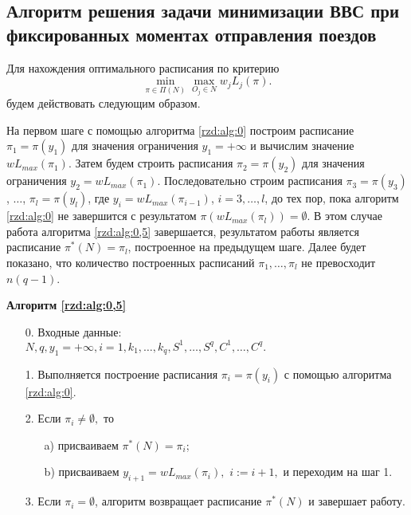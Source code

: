 \subsection{Алгоритм решения задачи минимизации ВВС при фиксированных моментах отправления поездов}\label{rzd:sec:main1:3}
Для нахождения оптимального расписания по критерию
\begin{equation*}
  \min\limits_{\pi \in \Pi(N)}\max\limits_{O_j\in N}w_j L_j(\pi).
\end{equation*}
будем действовать следующим образом.

На первом шаге с помощью алгоритма \ref{rzd:alg:0} построим расписание $\pi_1 = \pi(y_1)$ для значения ограничения $y_1 = +\infty$ и вычислим значение $wL_{max}(\pi_1)$. Затем будем строить расписания $\pi_2 = \pi(y_2)$ для значения ограничения $y_2 = wL_{max}(\pi_1)$. Последовательно строим расписания $\pi_3 =\pi(y_3)$, $\dots$, $\pi_{l} =\pi(y_l)$, где $y_i = wL_{max} (\pi_{i-1})$, $i=3, \dots, l$, до тех пор, пока алгоритм \ref{rzd:alg:0} не завершится с результатом $\pi(wL_{max}(\pi_{l})) = \emptyset.$ В этом случае работа алгоритма \ref{rzd:alg:0,5} завершается, результатом работы является расписание $\pi^{*}(N) = \pi_{l}$, построенное на предыдущем шаге. Далее будет показано, что количество построенных расписаний $\pi_1, \dots, \pi_l$ не превосходит $n(q-1)$.

\begin{algorithm}[H]\label{rzd:alg:0,5}
\NoCaptionOfAlgo
\caption{\textbf{Алгоритм \ref{rzd:alg:0,5}}}
\begin{itemize}
\item[0.] Входные данные:\\
$N, q, y_1 = +\infty, i=1, k_1, \dots, k_q, S^1, \dots, S^q, C^1, \dots, C^q. $
\item[1.] Выполняется построение расписания $\pi_i = \pi(y_i)$ с помощью алгоритма \ref{rzd:alg:0}.
\item[2.] Если $\pi_i \neq \emptyset,$ то
    \begin{itemize}
    \item[a)] присваиваем $\pi^{*}(N) = \pi_i$;
    \item[b)] присваиваем $y_{i+1} = wL_{max}(\pi_i),$ $i:=i+1,$ и переходим на шаг 1.
    \end{itemize}
\item[3.] Если $\pi_i = \emptyset$, алгоритм возвращает расписание $\pi^{*}(N)$ и завершает работу.
\end{itemize}
\end{algorithm}


